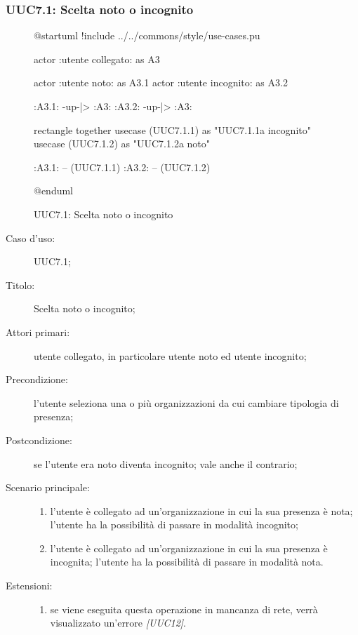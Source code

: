 \documentclass[../../../analisi-dei-requisiti.tex]{subfiles}
\begin{document}
\subsubsection{UUC7.1: Scelta noto o incognito}%
\label{subs:UUC7.1}

\begin{figure}[H]
  \centering
  \begin{plantuml}
  @startuml
  !include ../../commons/style/use-cases.pu

  actor :utente collegato: as A3

  actor :utente noto: as A3.1
  actor :utente incognito: as A3.2

  :A3.1: -up-|> :A3:
  :A3.2: -up-|> :A3:

  rectangle {
    together {
      usecase (UUC7.1.1) as "UUC7.1.1\nPassaggio a incognito"
      usecase (UUC7.1.2) as "UUC7.1.2\nPassaggio a noto"
    }
  }

  :A3.1: -- (UUC7.1.1)
  :A3.2: -- (UUC7.1.2)

  @enduml
  \end{plantuml}
  \caption{UUC7.1: Scelta noto o incognito}%
  \label{fig:uuc7_1}
\end{figure}

\begin{description}
  \item[Caso d’uso:] UUC7.1;
  \item[Titolo:] Scelta noto o incognito;
  \item[Attori primari:] utente collegato, in particolare utente noto ed utente incognito;
  \item[Precondizione:] l'utente seleziona una o più organizzazioni da cui cambiare tipologia di presenza;
  \item[Postcondizione:] se l'utente era noto diventa incognito; vale anche il contrario;
  \item[Scenario principale:]
        \begin{enumerate}
          \item l'utente è collegato ad un'organizzazione in cui la sua presenza è nota; l'utente ha la possibilità di passare in modalità incognito;
          \item l'utente è collegato ad un'organizzazione in cui la sua presenza è incognita; l'utente ha la possibilità di passare in modalità nota.
        \end{enumerate}
  \item[Estensioni:]
        \begin{enumerate}
          \item se viene eseguita questa operazione in mancanza di rete, verrà visualizzato un'errore \emph{[UUC12]}.
        \end{enumerate}
\end{description}
\end{document}
